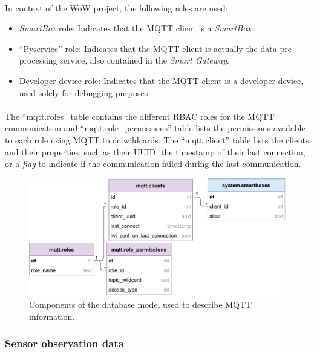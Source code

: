 \paragraph{} In context of the \acs{WoW} project, the following roles are used:

\begin{itemize}
    \item \textit{SmartBox} role: Indicates that the \acs{MQTT} client is a \textit{SmartBox}.
    \item ``Pyservice'' role: Indicates that the \acs{MQTT} client is actually the data pre-processing service, also contained in the \textit{Smart Gateway}.
    \item Developer device role: Indicates that the \acs{MQTT} client is a developer device, used solely for debugging purposes.
\end{itemize}

\paragraph{} The ``mqtt.roles'' table contains the different \acs{RBAC} roles for the \acs{MQTT} communication and ``mqtt.role\_permissions'' table lists the permissions available to each role using \acs{MQTT} topic wildcards. The ``mqtt.client'' table lists the clients and their properties, such as their \acs{UUID}, the timestamp of their last connection, or a \textit{flag} to indicate if the communication failed during the last communication.

\begin{figure}[H]
    \centering
    \includegraphics[width=0.75\linewidth]{images/database-schema-mqtt.pdf}
    \caption{Components of the database model used to describe \acs{MQTT} information. }
    \label{fig:wow-dbschema-mqtt}
\end{figure}


\subsubsection{Sensor observation data}

